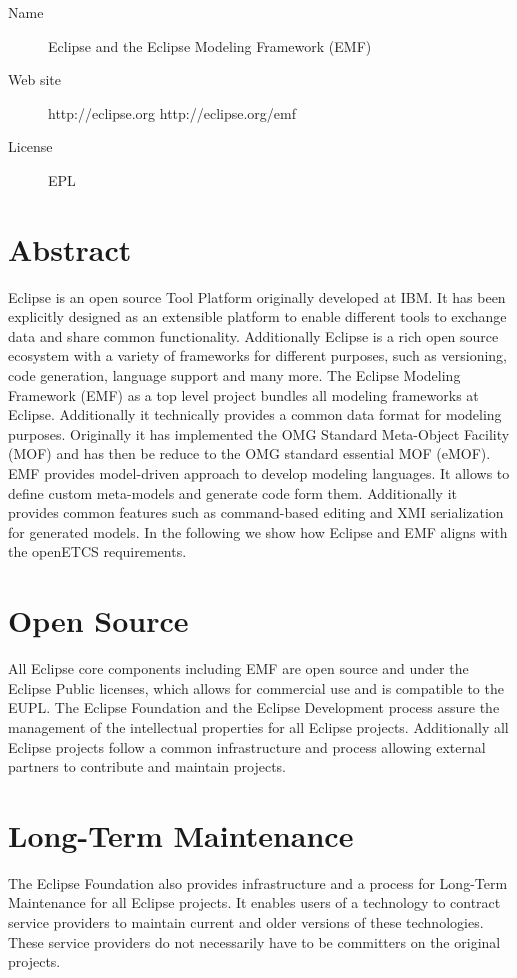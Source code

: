 \begin{description}
\item[Name] Eclipse and the Eclipse Modeling Framework (EMF)
\item[Web site] http://eclipse.org http://eclipse.org/emf
\item[License] EPL
\end{description}


\section{Abstract}
Eclipse is an open source Tool Platform originally developed at IBM. It has been explicitly designed as an extensible platform to enable different tools to exchange data and share common functionality. Additionally Eclipse is a rich open source ecosystem with a variety of frameworks for different purposes, such as versioning, code generation, language support and many more. The Eclipse Modeling Framework (EMF) as a top level project bundles all modeling frameworks at Eclipse. Additionally it technically provides a common data format for modeling purposes. Originally it has implemented the OMG Standard Meta-Object Facility (MOF) and has then be reduce to the OMG standard essential MOF (eMOF). EMF provides model-driven approach to develop modeling languages. It allows to define custom meta-models and generate code form them. Additionally it provides common features such as command-based editing and XMI serialization for generated models. In the following we show how Eclipse and EMF aligns with the openETCS requirements.
\section{Open Source}
All Eclipse core components including EMF are open source and under the Eclipse Public licenses, which allows for commercial use and is compatible to the EUPL. The Eclipse Foundation and the Eclipse Development process assure the management of the intellectual properties for all Eclipse projects. Additionally all Eclipse projects follow a common infrastructure and process allowing external partners to contribute and maintain projects. 
\section{Long-Term Maintenance}
The Eclipse Foundation also provides infrastructure and a process for Long-Term Maintenance for all Eclipse projects. It enables users of a technology to contract service providers to maintain current and older versions of these technologies. These service providers do not necessarily have to be committers on the original projects.
